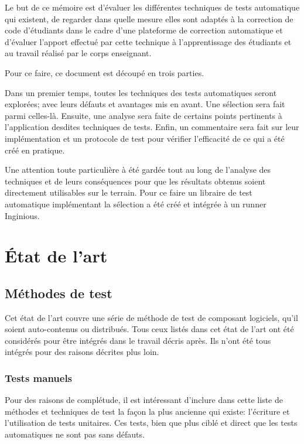 \documentclass[a4paper]{report}
\begin{document}
Le but de ce mémoire est d'évaluer les différentes techniques de tests automatique qui existent, de regarder dans quelle mesure elles sont adaptés à la correction de code d'étudiants dans le cadre d'une plateforme de correction automatique et d'évaluer l'apport effectué par cette technique à l'apprentissage des étudiants et au travail réalisé par le corps enseignant.

Pour ce faire, ce document est découpé en trois parties.

Dans un premier temps, toutes les techniques des tests automatiques seront explorées; avec leurs défauts et avantages mis en avant.
Une sélection sera fait parmi celles-là.
Ensuite, une analyse sera faite de certains points pertinents à l'application desdites techniques de tests.
Enfin, un commentaire sera fait sur leur implémentation et un protocole de test pour vérifier l'efficacité de ce qui a été créé en pratique.

Une attention toute particulière à été gardée tout au long de l'analyse des techniques et de leurs conséquences pour que les résultats obtenus soient directement utilisables sur le terrain.
Pour ce faire un libraire de test automatique implémentant la sélection a été créé et intégrée à un runner Inginious.


\chapter{État de l'art}


\section{Méthodes de test}
Cet état de l'art couvre une série de méthode de test de composant logiciels, qu'il soient auto-contenus ou distribués.
Tous ceux listés dans cet état de l'art ont été considérés pour être intégrés dans le travail décris après.
Ils n'ont été tous intégrés pour des raisons décrites plus loin.


\subsection{Tests manuels}

Pour des raisons de complétude, il est intéressant d’inclure dans cette liste de méthodes et techniques de test la façon la plus ancienne qui existe: l’écriture et l’utilisation de tests unitaires.
Ces tests, bien que plus ciblé et direct que les tests automatiques ne sont pas sans défauts.
\end{document}
